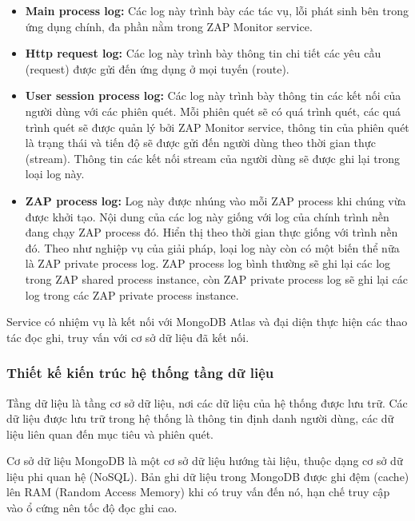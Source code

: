 \begin{itemize}
      \item \textbf{Main process log:} Các log này trình bày các tác vụ, lỗi phát sinh bên trong ứng dụng chính, đa phần nằm trong ZAP Monitor service.
      \item \textbf{Http request log:} Các log này trình bày thông tin chi tiết các yêu cầu (request) được gửi đến ứng dụng ở mọi tuyến (route).
      \item \textbf{User session process log:} Các log này trình bày thông tin các kết nối của người dùng với các phiên quét.
            Mỗi phiên quét sẽ có quá trình quét, các quá trình quét sẽ được quản lý bởi ZAP Monitor service, thông tin của phiên quét là trạng thái và tiến độ sẽ được gửi đến người dùng theo thời gian thực (stream).
            Thông tin các kết nối stream của người dùng sẽ được ghi lại trong loại log này.
      \item \textbf{ZAP process log:} Log này được nhúng vào mỗi ZAP process khi chúng vừa được khởi tạo.
            Nội dung của các log này giống với log của chính trình nền đang chạy ZAP process đó.
            Hiển thị theo thời gian thực giống với trình nền đó.
            Theo như nghiệp vụ của giải pháp, loại log này còn có một biến thể nữa là ZAP private process log.
            ZAP process log bình thường sẽ ghi lại các log trong ZAP shared process instance, còn ZAP private process log sẽ ghi lại các log trong các ZAP private process instance.
\end{itemize}

\tab \tab Service có nhiệm vụ là kết nối với MongoDB Atlas và đại diện thực hiện các thao tác đọc ghi, truy vấn với cơ sở dữ liệu đã kết nối.

\subsubsection{Thiết kế kiến trúc hệ thống tầng dữ liệu}

\tab Tầng dữ liệu là tầng cơ sở dữ liệu, nơi các dữ liệu của hệ thống được lưu trữ.
Các dữ liệu được lưu trữ trong hệ thống là thông tin định danh người dùng, các dữ liệu liên quan đến mục tiêu và phiên quét.
\par

Cơ sở dữ liệu MongoDB là một cơ sở dữ liệu hướng tài liệu, thuộc dạng cơ sở dữ liệu phi quan hệ (NoSQL).
Bản ghi dữ liệu trong MongoDB được ghi đệm (cache) lên RAM (Random Access Memory) khi có truy vấn đến nó, hạn chế truy cập vào ổ cứng nên tốc độ đọc ghi cao.
\par

